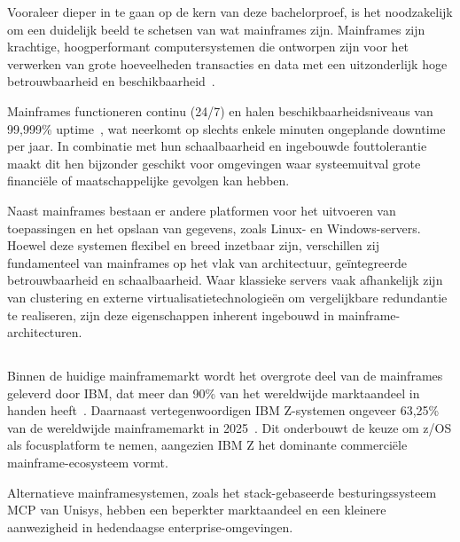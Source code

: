 Vooraleer dieper in te gaan op de kern van deze bachelorproef, is het noodzakelijk om een duidelijk beeld te schetsen van wat mainframes zijn. Mainframes zijn krachtige, hoogperformant computersystemen die ontworpen zijn voor het verwerken van grote hoeveelheden transacties en data met een uitzonderlijk hoge betrouwbaarheid en beschikbaarheid~\autocite{IBMMainframe}.

Mainframes functioneren continu (24/7) en halen beschikbaarheidsniveaus van 99,999\% uptime~\autocite{IBM_zOS_Concepts}, wat neerkomt op slechts enkele minuten ongeplande downtime per jaar. In combinatie met hun schaalbaarheid en ingebouwde fouttolerantie maakt dit hen bijzonder geschikt voor omgevingen waar systeemuitval grote financiële of maatschappelijke gevolgen kan hebben.

Naast mainframes bestaan er andere platformen voor het uitvoeren van toepassingen en het opslaan van gegevens, zoals Linux- en Windows-servers. Hoewel deze systemen flexibel en breed inzetbaar zijn, verschillen zij fundamenteel van mainframes op het vlak van architectuur, geïntegreerde betrouwbaarheid en schaalbaarheid. Waar klassieke servers vaak afhankelijk zijn van clustering en externe virtualisatietechnologieën om vergelijkbare redundantie te realiseren, zijn deze eigenschappen inherent ingebouwd in mainframe-architecturen.
\subsection{}
\label{sec:waarom-ibm-mainframe-of-zos}
Binnen de huidige mainframemarkt wordt het overgrote deel van de mainframes geleverd door IBM, dat meer dan 90\% van het wereldwijde marktaandeel in handen heeft~\autocite{MarketReportsWorld2026}. Daarnaast vertegenwoordigen IBM Z-systemen ongeveer 63,25\% van de wereldwijde mainframemarkt in 2025~\autocite{MordorIntelligence2026}. Dit onderbouwt de keuze om z/OS als focusplatform te nemen, aangezien IBM Z het dominante commerciële mainframe-ecosysteem vormt.

Alternatieve mainframesystemen, zoals het stack-gebaseerde besturingssysteem MCP van Unisys, hebben een beperkter marktaandeel en een kleinere aanwezigheid in hedendaagse enterprise-omgevingen.

\subsection{}
\label{sec:hardware-onderscheid}

